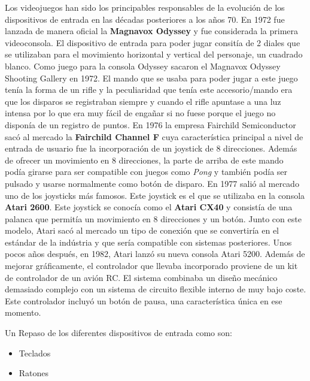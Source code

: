 Los videojuegos han sido los principables responsables de la evoluci\'on de los dispositivos de entrada en las d\'ecadas posteriores a los a\~nos 70. En 1972 fue lanzada de manera oficial la \textbf{Magnavox Odyssey} y fue considerada la primera videoconsola. El dispositivo de entrada para poder jugar consit\'ia de 2 diales que se utilizaban para el movimiento horizontal y vertical del personaje, un cuadrado blanco. Como juego para la consola Odyssey sacaron el Magnavox Odyssey Shooting Gallery en 1972. El mando que se usaba para poder jugar a este juego tenía la forma de un rifle y la peculiaridad que tenía este accesorio/mando era que los disparos se registraban siempre y cuando el rifle apuntase a una luz intensa por lo que era muy f\'acil de enga\~nar si no fuese porque el juego no dispon\'ia de un registro de puntos. En 1976 la empresa Fairchild Semiconductor sac\'o al mercado la \textbf{Fairchild Channel F} cuya caracter\'istica principal a nivel de entrada de usuario fue la incorporaci\'on de un joystick de 8 direcciones.  Adem\'as de ofrecer un movimiento en 8 direcciones, la parte de arriba de este mando pod\'ia girarse para ser compatible con juegos como \textit{Pong} y tambi\'en pod\'ia ser pulsado y usarse normalmente como bot\'on de disparo. En 1977 sali\'o al mercado uno de los joysticks m\'as famosos. Este joystick es el que se utilizaba en la consola \textbf{Atari 2600}. Este joystick se conoc\'ia como el \textbf{Atari CX40} y consist\'ia de una palanca que permit\'ia un movimiento en 8 direcciones y un bot\'on. Junto con este modelo, Atari sac\'o al mercado un tipo de conexi\'on que se convertir\'ia en el est\'andar de la ind\'ustria y que ser\'ia compatible con sistemas posteriores. Unos pocos a\~nos despu\'es, en 1982, Atari lanz\'o su nueva consola Atari 5200. Adem\'as de mejorar gr\'aficamente, el controlador que llevaba incorporado proviene de un kit de controlador de un avi\'on RC. El sistema combinaba un dise\~no mec\'anico demasiado complejo con un sistema de circuito flexible interno de muy bajo coste. Este controlador incluy\'o un bot\'on de pausa, una caracter\'istica \'unica en ese momento.

Un 
Repaso de los diferentes dispositivos de entrada como son:
\begin {itemize}

\item Teclados
\item Ratones

\end {itemize}


